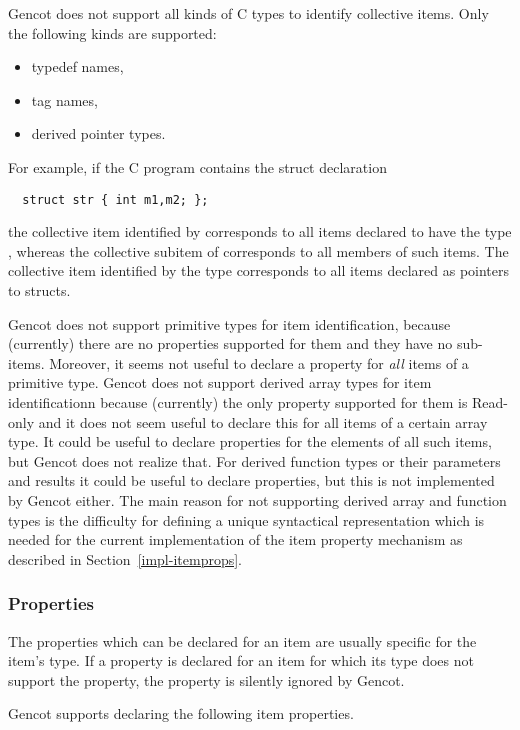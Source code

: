 Gencot does not support all kinds of C types to identify collective items. Only the following kinds are supported:
\begin{itemize}
\item typedef names,
\item tag names,
\item derived pointer types.
\end{itemize}

For example, if the C program contains the struct declaration
\begin{verbatim}
  struct str { int m1,m2; };
\end{verbatim}
the collective item identified by  corresponds to all items declared to have the type ,
whereas the collective subitem  of  corresponds to all members  of such items. The collective
item identified by the type  corresponds to all items declared as pointers to  structs.

Gencot does not support primitive types for item identification, because (currently) there are no properties supported
for them and they have no sub-items. Moreover, it seems not useful to declare a property for \textit{all} items of
a primitive type. Gencot does not support derived array types for item identificationn because (currently) the only 
property supported for them is Read-only and it does not seem useful to declare this for all items of a certain array 
type. It could be useful to declare properties for the elements of all such items, but Gencot does not realize that.
For derived function types or their parameters and results it could be useful to declare properties, but this is not
implemented by Gencot either. The main reason for not supporting derived array and function types is the difficulty
for defining a unique syntactical representation which is needed for the current implementation of the item property
mechanism as described in Section~\ref{impl-itemprops}.

\subsubsection{Properties}

The properties which can be declared for an item are usually specific for the item's type. If a property is declared
for an item for which its type does not support the property, the property is silently ignored by Gencot.

Gencot supports declaring the following item properties.

